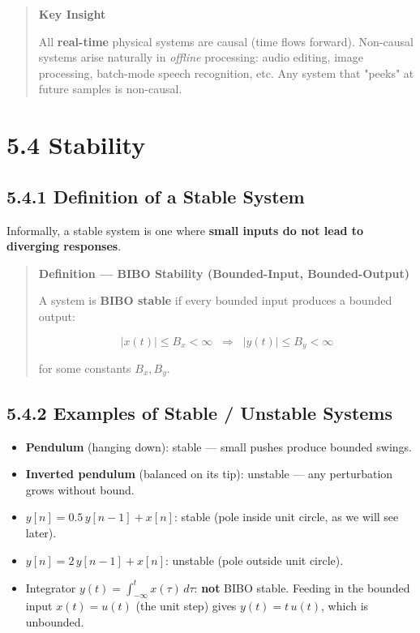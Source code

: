 \documentclass[11pt]{article}
\begin{document}
\begin{quote}
\textbf{Key Insight}

All \textbf{real-time} physical systems are causal (time flows forward). Non-causal systems arise naturally in \textit{offline} processing: audio editing, image processing, batch-mode speech recognition, etc. Any system that "peeks" at future samples is non-causal.
\end{quote}

\section*{5.4 Stability}

\subsection*{5.4.1 Definition of a Stable System}

Informally, a stable system is one where \textbf{small inputs do not lead to diverging responses}.

\begin{quote}
\textbf{Definition — BIBO Stability (Bounded-Input, Bounded-Output)}

A system is \textbf{BIBO stable} if every bounded input produces a bounded output:

\[|x(t)| \leq B_x < \infty \;\;\Longrightarrow\;\; |y(t)| \leq B_y < \infty\]

for some constants $B_x, B_y$.
\end{quote}

\subsection*{5.4.2 Examples of Stable / Unstable Systems}

\begin{itemize}
  \item \textbf{Pendulum} (hanging down): stable — small pushes produce bounded swings.
  \item \textbf{Inverted pendulum} (balanced on its tip): unstable — any perturbation grows without bound.
  \item $y[n] = 0.5\,y[n-1] + x[n]$: stable (pole inside unit circle, as we will see later).
  \item $y[n] = 2\,y[n-1] + x[n]$: unstable (pole outside unit circle).
  \item Integrator $y(t) = \int_{-\infty}^t x(\tau)\,d\tau$: \textbf{not} BIBO stable. Feeding in the bounded input $x(t) = u(t)$ (the unit step) gives $y(t) = t\,u(t)$, which is unbounded.
\end{itemize}
\end{document}
